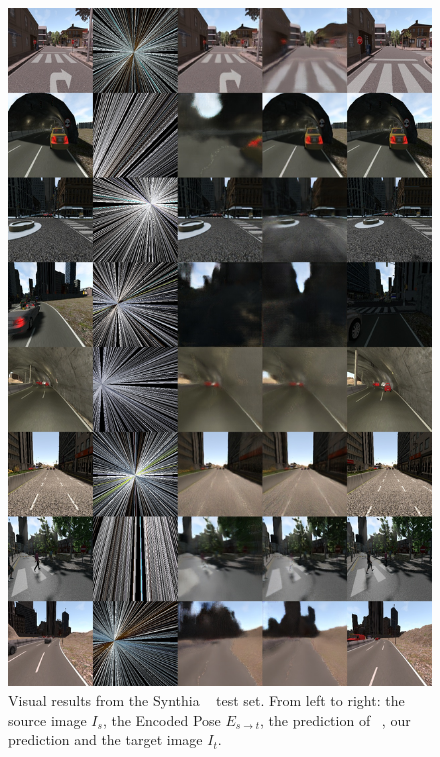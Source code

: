 \begin{figure}[htp!]
    \begin{center}
    \includegraphics[width=.9\textwidth]{images/epipolarnvs/SuppMat_Synthia.jpg}
    \end{center}
     \caption{Visual results from the Synthia ~\cite{Synthia} test set. From left to right: the source image  $I_s$, the Encoded Pose $E_{s\xrightarrow{}t}$,  the prediction of ~\cite{NVS_skip}, our prediction and the target image $I_t$.}
     \label{fig:add_visSynthia}
\end{figure}

